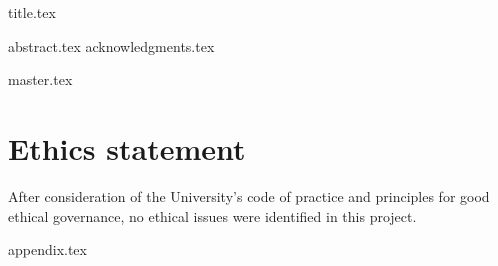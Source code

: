 \documentclass[a4paper, 12pt]{report}
\begin{document}
{title.tex}



\setcounter{tocdepth}{4}




{abstract.tex}
{acknowledgments.tex}


\tableofcontents

\newpage

\listoffigures

\newpage

\listoftables


% 

\printglossary[type=acronym]




\newpage



{master.tex}






\chapter{Ethics statement}

After consideration of the University's code of practice and principles for good ethical governance, no ethical issues were identified in this project. 


{appendix.tex}





\end{document}
